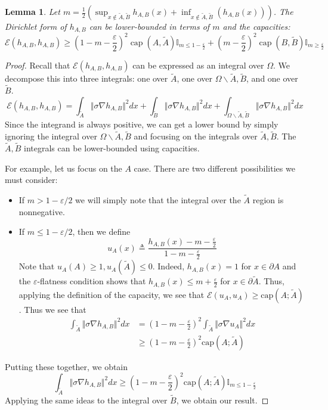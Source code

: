 \documentclass[english, aip, jcp, priprint, graphicx,floatfix]{revtex4-1}
\newcommand{\tmop}[1]{\ensuremath{\operatorname{#1}}}
\newtheorem{lemma}{Lemma}
\theoremstyle{plain}
\theoremstyle{definition}
\theoremstyle{plain}
\newcommand{\indicatorf}[1]{\mathbb{I}_{#1}}
\newcommand{\capac}[2]{\mathrm{cap}\left(#1;#2\right)}
\begin{document}

\begin{lemma}  Let $m = \frac{1}{2} (\sup_{x \notin \tilde A,\tilde B} h_{A,B} (x) + \inf_{x \notin \tilde A,\tilde B} (h_{A,B} (x)))$.  The Dirichlet form of $h_{A,B}$ can be lower-bounded in terms of $m$ and the capacities:
\[\mathcal{E} (h_{A,B}, h_{A,B}) \geq  
   \left( 1 - m - \frac{\varepsilon}{2} \right)^2 \tmop{cap} (A,\tilde{A}) \indicatorf{m\leq 1-\frac{\varepsilon}{2}} + 
   \left( m- \frac{\varepsilon}{2} \right)^2 \tmop{cap} (B, \tilde{B})\indicatorf{m\geq \frac{\varepsilon}{2}} 
\]
\end{lemma}
\begin{proof}
Recall that $\mathcal{E} (h_{A,B}, h_{A,B})$ can be expressed as an integral over $\Omega$.  We decompose this into three integrals: one over $\tilde A$, one over $\Omega \backslash \tilde A,\tilde B$, and one over $\tilde B$.  
\[
\mathcal{E} (h_{A,B}, h_{A,B}) = \int_{\tilde A} \Vert \sigma \nabla h_{A,B}\Vert^2 dx
                                 + \int_{\tilde B} \Vert \sigma \nabla h_{A,B}\Vert^2 dx
                                 + \int_{\Omega \backslash \tilde A,\tilde B} \Vert \sigma \nabla h_{A,B}\Vert^2 dx
\]
Since the integrand is always positive, we can get a lower bound by simply ignoring the integral over $\Omega \backslash \tilde A,\tilde B$ and focusing on the integrals over $\tilde A,\tilde B$.  The $\tilde A,\tilde B$ integrals can be lower-bounded using capacities.  

For example, let us focus on the $A$ case.  There are two different possibilities we must consider:
\begin{itemize}
\item If $m>1-\varepsilon/2$ we will simply note that the integral over the $\tilde A$ region is nonnegative.  
\item If $m\leq 1-\varepsilon/2$, then we define
    \[
    u_A (x) \triangleq \frac{h_{A,B} (x) - m - \frac{\varepsilon}{2}}{1 - m - \frac{\varepsilon}{2}}
    \]
    Note that $u_A(A)\geq1,u_A(\tilde A)\leq 0$.  Indeed, $h_{A,B}(x)=1$ for $x \in \partial A$ and the $\varepsilon$-flatness condition shows that $h_{A,B}(x) \leq m + \frac {\varepsilon}{2}$ for $x \in \partial \tilde A$.  Thus, applying the definition of the capacity, we see that $\mathcal{E}(u_A,u_A) \geq \capac{A}{\tilde A}$.  Thus we see that
    \begin{align*}
    \int_{\tilde A} \Vert \sigma \nabla h_{A,B}\Vert^2 dx &= \left(1 - m - \frac{\varepsilon}{2}\right)^2 \int_{\tilde A} \Vert \sigma \nabla u_{A}\Vert^2 dx\\
         &\geq \left(1 - m - \frac{\varepsilon}{2}\right)^2 \capac{A}{\tilde A}
    \end{align*}
\end{itemize}
Putting these together, we obtain
\[
\int_{\tilde A} \Vert \sigma \nabla h_{A,B}\Vert^2 dx \geq \left(1 - m - \frac{\varepsilon}{2}\right)^2 \capac{A}{\tilde A}\indicatorf{m\leq 1-\frac{\varepsilon}{2}}
\]
Applying the same ideas to the integral over $\tilde B$, we obtain our result.
\end{proof}
\end{document}
